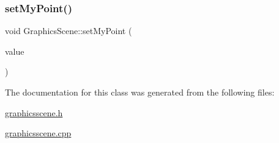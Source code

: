 \mbox{\label{class_graphics_scene_a2853f7e6ab37aeaa25c1dfc2d33eb7af}} 
\subsubsection{\texorpdfstring{set\+My\+Point()}{setMyPoint()}}
{\footnotesize\ttfamily void Graphics\+Scene\+::set\+My\+Point (\begin{DoxyParamCaption}\item[{const Q\+PointF \&}]{value }\end{DoxyParamCaption})}



The documentation for this class was generated from the following files\+:\begin{DoxyCompactItemize}
\item 
\hyperlink{graphicsscene_8h}{graphicsscene.\+h}\item 
\hyperlink{graphicsscene_8cpp}{graphicsscene.\+cpp}\end{DoxyCompactItemize}
